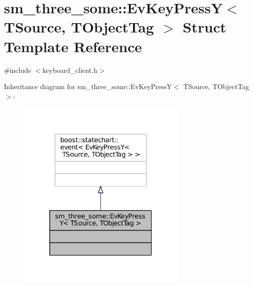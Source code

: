 \hypertarget{structsm__three__some_1_1EvKeyPressY}{}\section{sm\+\_\+three\+\_\+some\+:\+:Ev\+Key\+PressY$<$ T\+Source, T\+Object\+Tag $>$ Struct Template Reference}
\label{structsm__three__some_1_1EvKeyPressY}


{\ttfamily \#include $<$keyboard\+\_\+client.\+h$>$}



Inheritance diagram for sm\+\_\+three\+\_\+some\+:\+:Ev\+Key\+PressY$<$ T\+Source, T\+Object\+Tag $>$\+:
\nopagebreak
\begin{figure}[H]
\begin{center}
\leavevmode
\includegraphics[width=235pt]{structsm__three__some_1_1EvKeyPressY__inherit__graph}
\end{center}
\end{figure}


